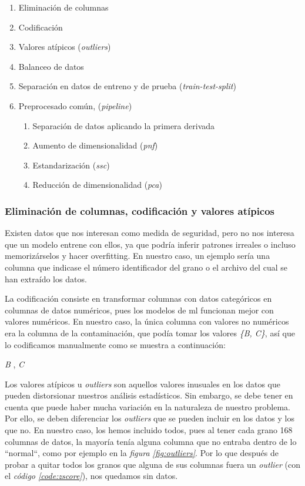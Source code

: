 \begin{enumerate}
    \item Eliminación de columnas
    \item Codificación
    \item Valores atípicos (\textit{outliers})
    \item Balanceo de datos
    \item Separación en datos de entreno y de prueba (\textit{train-test-split})
    \item Preprocesado común, (\textit{pipeline})
    \begin{enumerate}
        \item Separación de datos aplicando la primera derivada 
        \item Aumento de dimensionalidad (\textit{\gls{pnf}})
        \item Estandarización  (\textit{\gls{ssc}})
        \item Reducción de dimensionalidad (\textit{\gls{pca}})
    \end{enumerate}
    
\end{enumerate}


\subsubsection{Eliminación de columnas, codificación y valores atípicos}

Existen datos que nos interesan como medida de seguridad, pero no nos interesa que un modelo entrene con ellos, ya que podría inferir patrones irreales o incluso memorizárselos y hacer \gls{overfitting}. En nuestro caso, un ejemplo sería una columna que indicase el número identificador del grano o el archivo del cual se han extraído los datos.

La codificación consiste en transformar columnas con datos categóricos en columnas de datos numéricos, pues los modelos de \acrshort{ml} funcionan mejor con valores numéricos. En nuestro caso, la única columna con valores no numéricos era la columna de la contaminación, que podía tomar los valores \textit{\{B, C\}}, así que lo codificamos manualmente como se muestra a continuación:

{\centering
    \textit{B }, \textit{C }\par
}

Los valores atípicos u \textit{outliers} son aquellos valores inusuales en los datos que pueden distorsionar nuestros análisis estadísticos. Sin embargo, se debe tener en cuenta que puede haber mucha variación en la naturaleza de nuestro problema. Por ello, se deben diferenciar los \textit{outliers} que se pueden incluir en los datos y los que no. En nuestro caso, los hemos incluido todos, pues al tener cada grano 168 columnas de datos, la mayoría tenía alguna columna que no entraba dentro de lo ``normal``, como por ejemplo en la \textit{figura \ref{fig:outliers}}. Por lo que después de probar a quitar todos los granos que alguna de sus columnas fuera un \textit{outlier} (con el \textit{código \ref{code:zscore}}), nos quedamos sin datos.

